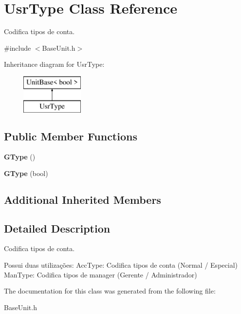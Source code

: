 \hypertarget{classUsrType}{\section{Usr\-Type Class Reference}
\label{classUsrType}
}


Codifica tipos de conta.  




{\ttfamily \#include $<$Base\-Unit.\-h$>$}

Inheritance diagram for Usr\-Type\-:\begin{figure}[H]
\begin{center}
\leavevmode
\includegraphics[height=2.000000cm]{classUsrType}
\end{center}
\end{figure}
\subsection*{Public Member Functions}
\begin{DoxyCompactItemize}
\item 
\hypertarget{classUsrType_a551a40c57ccc7dec21a42e539ff5899c}{{\bfseries G\-Type} ()}\label{classUsrType_a551a40c57ccc7dec21a42e539ff5899c}

\item 
\hypertarget{classUsrType_a4b88730c90e740fa4e9ca4d247ee8616}{{\bfseries G\-Type} (bool)}\label{classUsrType_a4b88730c90e740fa4e9ca4d247ee8616}

\end{DoxyCompactItemize}
\subsection*{Additional Inherited Members}


\subsection{Detailed Description}
Codifica tipos de conta. 

Possui duas utilizações\-: Acc\-Type\-: Codifica tipos de conta (Normal / Especial) Man\-Type\-: Codifica tipos de manager (Gerente / Administrador) 

The documentation for this class was generated from the following file\-:\begin{DoxyCompactItemize}
\item 
Base\-Unit.\-h\end{DoxyCompactItemize}
